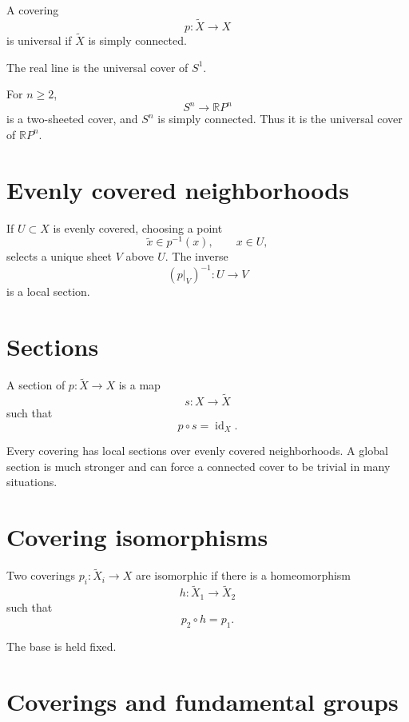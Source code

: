 \begin{definition}
\label{def:viii10-universal-cover}
A covering
\[
p:\widetilde X\to X
\]
is universal if \(\widetilde X\) is simply connected.
\end{definition}

The real line is the universal cover of \(S^1\).

\begin{example}
For \(n\ge2\),
\[
S^n\to\mathbb RP^n
\]
is a two-sheeted cover, and \(S^n\) is simply connected.  Thus it is the
universal cover of \(\mathbb RP^n\).
\end{example}

\section{Evenly covered neighborhoods}

If \(U\subset X\) is evenly covered, choosing a point
\[
\tilde x\in p^{-1}(x),\qquad x\in U,
\]
selects a unique sheet \(V\) above \(U\).  The inverse
\[
(p|_V)^{-1}:U\to V
\]
is a local section.

\section{Sections}

\begin{definition}[Section]
\label{def:viii10-section}
A section of \(p:\widetilde X\to X\) is a map
\[
s:X\to\widetilde X
\]
such that
\[
p\circ s=\operatorname{id}_X.
\]
\end{definition}

Every covering has local sections over evenly covered neighborhoods.  A global
section is much stronger and can force a connected cover to be trivial in many
situations.

\section{Covering isomorphisms}

\begin{definition}
\label{def:viii10-cover-isomorphism}
Two coverings \(p_i:\widetilde X_i\to X\) are isomorphic if there is a
homeomorphism
\[
h:\widetilde X_1\to\widetilde X_2
\]
such that
\[
p_2\circ h=p_1.
\]
\end{definition}

The base is held fixed.

\section{Coverings and fundamental groups}

